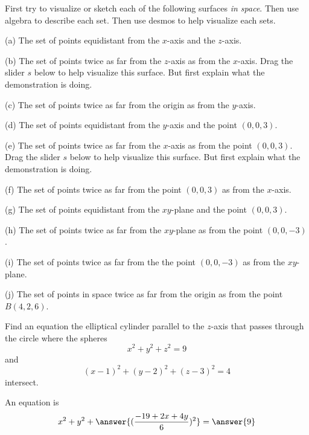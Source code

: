 \documentclass{ximera}
\begin{document}
\begin{question}  \label{Q:343w4ffer}
First try to visualize or sketch each of the following surfaces \emph{in space}. Then use algebra to describe each set. Then use desmos to help 
visualize each sets.

(a) The set of points equidistant from the $x$-axis and the $z$-axis.

(b) The set of points twice as far from the $z$-axis as from the $x$-axis. Drag the slider $s$ below to help visualize this surface. But first explain what the demonstration is doing.

\begin{onlineOnly}
    \begin{center}
\end{center}
\end{onlineOnly}

(c) The set of points twice as far from the origin as from the $y$-axis.

(d) The set of points equidistant from the $y$-axis and the point $(0,0,3)$.

(e) The set of points twice as far from the $x$-axis as from the point $(0,0,3)$. Drag the slider $s$ below to help visualize this surface. But first explain what the demonstration is doing.

\begin{onlineOnly}
    \begin{center}
\end{center}
\end{onlineOnly}

(f) The set of points twice as far from the point $(0,0,3)$ as from the $x$-axis.

(g) The set of points equidistant from the $xy$-plane and the point $(0,0,3)$.

(h) The set of points twice as far from the $xy$-plane as from the point $(0,0,-3)$.

(i) The set of points twice as far from the the point $(0,0,-3)$ as from the $xy$-plane.

(j) The set of points in space twice as far from the origin as from the point $B(4,2,6)$.

\end{question}


\begin{question} \label{Qdfrr3rf}
Find an equation the elliptical cylinder parallel to the $z$-axis that passes through the circle where the spheres
\[
    x^2 + y^2 + z^2 = 9
\]
and
\[
   (x-1)^2 + (y-2)^2 + (z-3)^2 = 4
\]
intersect.

An equation is
\[
       x^2 + y^2 + \answer{(\frac{-19+2x+4y}{6})^2} = \answer{9}
\]
\end{question}
\end{document}

